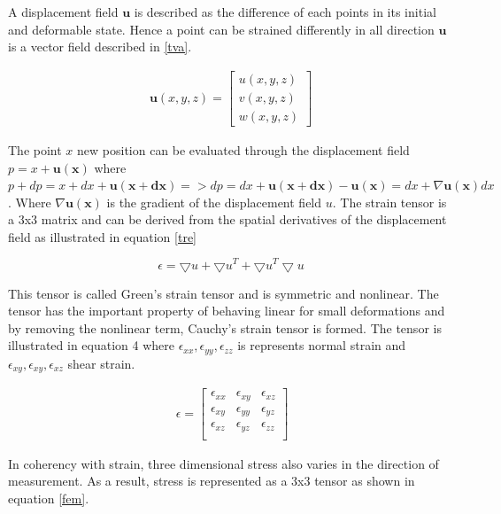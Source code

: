\documentclass[10pt,a4paper]{article}
\begin{document}
A displacement field $\mathbf{u}$ is described as the difference of each points in its initial and deformable state. Hence a point can be strained differently in all direction $\mathbf{u}$ is a vector field described in \ref{tva}.


\begin{eqnarray}\label{tva}
    \mathbf{u}(x, y, z) = \left[ \begin{array}{c}
u(x, y, z) \\
v(x, y, z) \\
w(x, y, z) \end{array} \right]
\end{eqnarray}

The point $x$ new position can be evaluated through the displacement field $p=x+\mathbf{u(x)}$
where $p+dp = x+dx + \mathbf{u(x+dx)} => dp = dx + \mathbf{u(x+dx)}-\mathbf{u(x)} = dx +\nabla \mathbf{u(x)}dx$. Where $\nabla \mathbf{u(x)}$ is the gradient of the displacement field $u$. The strain tensor is a 3x3 matrix and can be derived from the spatial derivatives of the displacement field as illustrated in equation \ref{tre}

\begin{equation}\label{tre}
    \epsilon = \bigtriangledown u + \bigtriangledown u^{T} + \bigtriangledown u^{T} \bigtriangledown u
\end{equation}

This tensor is called Green’s strain tensor and is symmetric and nonlinear. The tensor has the important property of behaving linear for small deformations
and by removing the nonlinear term, Cauchy’s strain tensor is formed. The tensor is illustrated in equation 4 where $\epsilon_{xx}, \epsilon_{yy}, \epsilon_{zz}$ is represents normal strain and $\epsilon_{xy}, \epsilon_{xy}, \epsilon_{xz}$  shear strain.

\begin{eqnarray}\
\epsilon =  \left[ \begin{array}{cccc}
\epsilon_{xx} & \epsilon_{xy} & \epsilon_{xz} \\
\epsilon_{xy} & \epsilon_{yy} & \epsilon_{yz} \\
\epsilon_{xz} & \epsilon_{yz} & \epsilon_{zz} \\
 \end{array} \right]
\end{eqnarray}

In coherency with strain, three dimensional stress also varies in the direction of measurement. As a result, stress is represented as a 3x3 tensor as shown in equation \ref{fem}.
\end{document}

